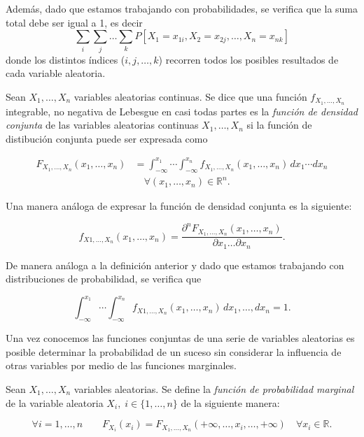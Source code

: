 Además, dado que estamos trabajando con probabilidades, se verifica que la suma total debe ser igual a 1, es decir 
\[ \sum_{i}\sum_{j}\ldots\sum_{k}P[X_1=x_{1i}, X_2=x_{2j}, \ldots, X_n=x_{nk}] \]
donde los distintos índices ($i, j, \ldots, k$) recorren todos los posibles resultados de cada variable aleatoria.\newline

\begin{definicion}
    Sean $X_1, \ldots, X_n$ variables aleatorias continuas. Se dice que una función $f_{X_{1}, \ldots, X_n}$ integrable, no negativa de Lebesgue en casi todas partes es la \emph{función de densidad conjunta} de las variables aleatorias continuas $X_1, \ldots, X_n$ si la función de distibución conjunta puede ser expresada como

    \begin{align*}
        F_{X_{1}, \ldots, X_{n}}(x_1, \ldots, x_n) &=  
        \int_{-\infty}^{x_1} \cdots \int_{-\infty}^{x_n} 
        f_{X_{1}, \ldots, X_n}(x_1, \ldots, x_n) \, dx_1 \cdots dx_n \\
        &\quad \forall(x_1, \ldots, x_n) \in \mathbb{R}^n.
    \end{align*}

    Una manera análoga de expresar la función de densidad conjunta es la siguiente:

    \[ f_{X{1}, \ldots, X_n} (x_1, \ldots, x_n) = \frac{\partial^{n}F_{X_{1}, \ldots, X_{n}}(x_1, \ldots, x_n)}{\partial x_1 \ldots \partial x_n}. \]\newline
\end{definicion}

De manera análoga a la definición anterior y dado que estamos trabajando con distribuciones de probabilidad, se verifica que 

\[ \int_{-\infty}^{x_1} \cdots \int_{-\infty}^{x_n} f_{X{1}, \ldots, X_n} (x_1, \ldots, x_n) \, dx_1, \ldots,  dx_n = 1. \]\newline


Una vez conocemos las funciones conjuntas de una serie de variables aleatorias es posible determinar la probabilidad de un suceso sin considerar la influencia de otras variables por medio de las funciones marginales.\newline

\begin{definicion}
    Sean $X_1, \ldots, X_n$ variables aleatorias. Se define la \emph{función de probabilidad marginal} de la variable aleatoria $X_i, \; i \in \{1, \ldots, n\}$ de la siguiente manera:

    \[ \forall i = 1,\ldots,n  \qquad F_{X_i}(x_i) = F_{X_{1}, \ldots, X_{n}}(+\infty, \ldots,x_i, \ldots,+\infty) \quad \forall x_i \in \mathbb{R}. \]\newline
\end{definicion}

